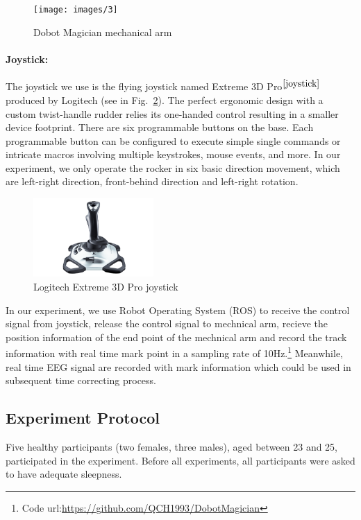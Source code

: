 \documentclass[runningheads,a4paper]{llncs}
\begin{document}
\begin{figure}
    \centering
    \texttt{[image: images/3]}
    \caption{Dobot Magician mechanical arm}
    \label{fig:dobot}
\end{figure}

\paragraph{Joystick:}
The joystick we use is the flying joystick named Extreme 3D
Pro$^{\cite{joystick}}$ produced by Logitech (see in Fig.~\ref{fig:joystick}).
The perfect ergonomic design with a custom twist-handle rudder relies
its one-handed control resulting in a smaller device footprint.
There are six programmable buttons on the base.
Each programmable button can be configured to execute simple single commands or
intricate macros involving multiple keystrokes, mouse events, and more.
In our experiment, we only operate the rocker in six basic direction movement,
which are left-right direction, front-behind direction and left-right rotation.

\begin{figure}
    \centering
    \includegraphics[height=3cm]{images/4}
    \caption{Logitech Extreme 3D Pro joystick}
    \label{fig:joystick}
\end{figure}

In our experiment, we use Robot Operating System (ROS) to receive the control
signal from joystick, release the control signal to mechnical arm, recieve the
position information of the end point of the mechnical arm and record the track
information with real time mark point in a sampling rate of
10Hz.\footnote{Code url:\url{https://github.com/QCH1993/DobotMagician}} Meanwhile,
real time EEG signal are recorded with mark information which could be used in
subsequent time correcting process.

\subsection{Experiment Protocol}
Five healthy participants (two females, three males), aged between 23 and 25,
participated in the experiment. Before all experiments, all participants were
asked to have adequate sleepness.
\end{document}
